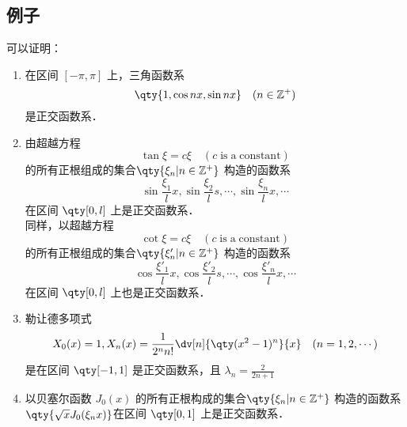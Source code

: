 \subsection{例子}
可以证明：
\begin{enumerate}
\item 在区间 $[-\pi,\pi]$ 上，三角函数系
\begin{equation}
\qty{1,\cos nx,\sin nx}\quad(n\in \mathbb{Z^{+}})
\end{equation}
是正交函数系．
\item 由超越方程
\begin{equation}
\tan\xi=c\xi \quad(c\; \mathrm{is\; a\; constant})
\end{equation}
 的所有正根组成的集合$\qty{\xi_n\vert n\in\mathbb{Z}^+}$
 构造的函数系
 \begin{equation}
 \sin\frac{\xi_1}{l}x,\sin\frac{\xi_2}{l}s,\cdots,\sin\frac{\xi_n}{l}x,\cdots
 \end{equation}
 在区间 $\qty[0,l]$ 上是正交函数系．\\
 
 同样，以超越方程
\begin{equation}
\cot\xi=c\xi \quad(c\; \mathrm{is\; a\; constant})
\end{equation}
 的所有正根组成的集合$\qty{\xi'_n\vert n\in\mathbb{Z}^+}$
 构造的函数系
 \begin{equation}
 \cos\frac{\xi'_1}{l}x,\cos\frac{\xi'_2}{l}s,\cdots,\cos\frac{\xi'_n}{l}x,\cdots
 \end{equation}
 在区间 $\qty[0,l]$ 上也是正交函数系．
 \item 勒让德多项式
\begin{equation}
X_0(x)=1,X_n(x)=\frac{1}{2^nn!}\dv[n]{\qty(x^2-1)^n}{x}\quad(n=1,2,\cdots)
\end{equation}
是在区间 $\qty[-1,1]$ 是正交函数系，且 $\lambda_n=\frac{2}{2n+1}$
\item 以贝塞尔函数 $J_0(x)$ 的所有正根构成的集合$\qty{\xi_n\vert n\in\mathbb{Z}^+}$
构造的函数系$\qty{\sqrt{x}J_0(\xi_n x)} $在区间 $\qty[0,1]$ 上是正交函数系．
\end{enumerate}




